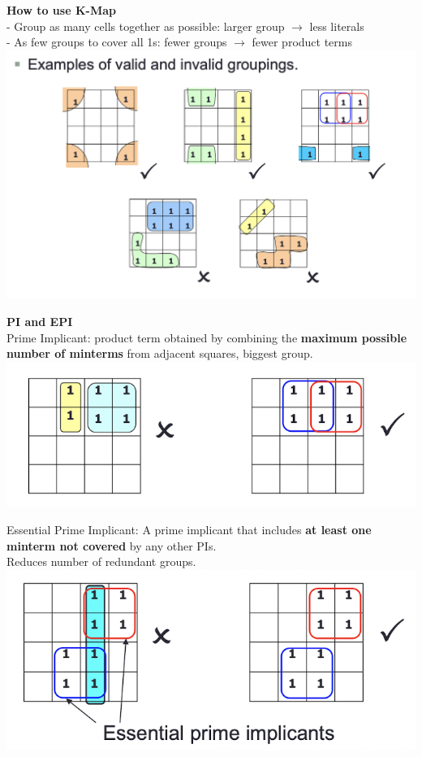 \documentclass[10pt, a4paper]{article}
\newcommand{\highlight}[1]{{\color{red}\textbf{#1}}}
\begin{document}
\begin{multicols*}{3}
		\textbf{How to use K-Map}\\
		- Group as many cells together as possible: larger group $\rightarrow$ less literals\\
		- As few groups to cover all 1s: fewer groups $\rightarrow$ fewer product terms\\
		\includegraphics[scale=.35]{./assets/validInvalidGroupings}
		
		\textbf{PI and EPI}\\
		Prime Implicant: product term obtained by combining the \highlight{maximum possible number of minterms} from adjacent squares, biggest group.\\
		\includegraphics[scale=.4]{./assets/primeImplicant}

		Essential Prime Implicant: A prime implicant that includes \highlight{at least one minterm not covered} by any other PIs.\\
		Reduces number of redundant groups.\\
		\includegraphics[scale=.4]{./assets/EPI}
		

\end{multicols*}
\end{document}
